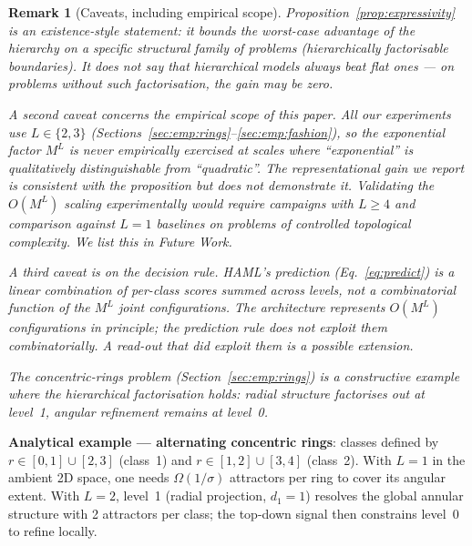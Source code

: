 \documentclass[11pt,a4paper]{article}
\newtheorem{remark}[theorem]{Remark}
\begin{document}
\begin{remark}[Caveats, including empirical scope]
\label{rem:expressivity}
Proposition~\ref{prop:expressivity} is an \emph{existence}-style statement: it bounds
the worst-case advantage of the hierarchy on a specific structural family of problems
(hierarchically factorisable boundaries). It does not say that hierarchical models
always beat flat ones --- on problems without such factorisation, the gain may be zero.

A second caveat concerns the empirical scope of this paper. All our experiments use
$L \in \{2, 3\}$ (Sections~\ref{sec:emp:rings}--\ref{sec:emp:fashion}), so the
exponential factor $M^L$ is \emph{never empirically exercised} at scales where
``exponential'' is qualitatively distinguishable from ``quadratic''. The
representational gain we report is consistent with the proposition but does not
demonstrate it. Validating the $O(M^L)$ scaling experimentally would require campaigns
with $L \ge 4$ and comparison against $L=1$ baselines on problems of controlled
topological complexity. We list this in Future Work.

A third caveat is on the decision rule. HAML's prediction (Eq.~\ref{eq:predict}) is a
linear combination of per-class scores summed across levels, not a combinatorial
function of the $M^L$ joint configurations. The architecture \emph{represents} $O(M^L)$
configurations in principle; the prediction rule does not exploit them combinatorially.
A read-out that did exploit them is a possible extension.

The concentric-rings problem (Section~\ref{sec:emp:rings}) is a constructive example
where the hierarchical factorisation holds: radial structure factorises out at
level~1, angular refinement remains at level~0.
\end{remark}

\textbf{Analytical example --- alternating concentric rings}: classes defined by
$r \in [0,1] \cup [2,3]$ (class~1) and $r \in [1,2] \cup [3,4]$ (class~2). With $L=1$
in the ambient 2D space, one needs $\Omega(1/\sigma)$ attractors per ring to cover its
angular extent. With $L=2$, level~1 (radial projection, $d_1=1$) resolves the global
annular structure with 2 attractors per class; the top-down signal then constrains
level~0 to refine locally.
\end{document}
